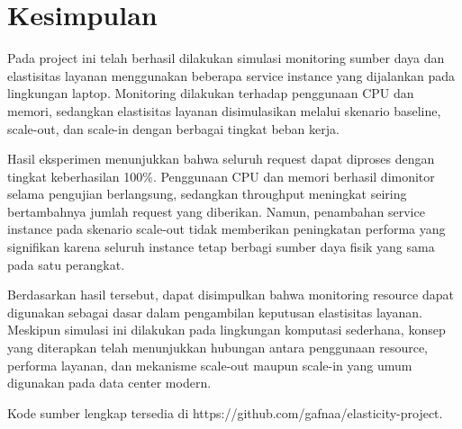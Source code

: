 \documentclass[conference]{IEEEtran}
\begin{document}
\section{Kesimpulan}
Pada project ini telah berhasil dilakukan simulasi monitoring sumber daya dan elastisitas layanan menggunakan beberapa service instance yang dijalankan pada lingkungan laptop. Monitoring dilakukan terhadap penggunaan CPU dan memori, sedangkan elastisitas layanan disimulasikan melalui skenario baseline, scale-out, dan scale-in dengan berbagai tingkat beban kerja.

Hasil eksperimen menunjukkan bahwa seluruh request dapat diproses dengan tingkat keberhasilan 100\%. Penggunaan CPU dan memori berhasil dimonitor selama pengujian berlangsung, sedangkan throughput meningkat seiring bertambahnya jumlah request yang diberikan. Namun, penambahan service instance pada skenario scale-out tidak memberikan peningkatan performa yang signifikan karena seluruh instance tetap berbagi sumber daya fisik yang sama pada satu perangkat.

Berdasarkan hasil tersebut, dapat disimpulkan bahwa monitoring resource dapat digunakan sebagai dasar dalam pengambilan keputusan elastisitas layanan. Meskipun simulasi ini dilakukan pada lingkungan komputasi sederhana, konsep yang diterapkan telah menunjukkan hubungan antara penggunaan resource, performa layanan, dan mekanisme scale-out maupun scale-in yang umum digunakan pada data center modern.

Kode sumber lengkap tersedia di https://github.com/gafnaa/elasticity-project.
\end{document}
